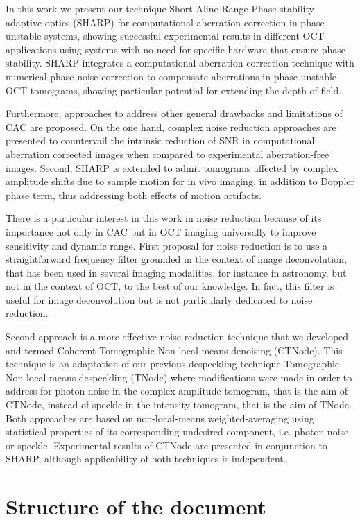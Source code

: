 In this work we present our technique Short Aline-Range Phase-stability adaptive-optics (SHARP) for computational aberration correction in phase unstable systems, showing successful experimental results in different OCT applications using systems with no need for specific hardware that ensure phase stability. SHARP integrates a computational aberration correction technique with numerical phase noise correction to compensate aberrations in phase unstable OCT tomograms, showing particular potential for extending the depth-of-field.

Furthermore, approaches to address other general drawbacks and limitations of CAC are proposed. On the one hand, complex noise reduction approaches are presented to countervail the intrinsic reduction of SNR in computational aberration corrected images when compared to experimental aberration-free images. Second, SHARP is extended to admit tomograms affected by complex amplitude shifts due to sample motion for in vivo imaging, in addition to Doppler phase term, thus addressing both effects of motion artifacts.

There is a particular interest in this work in noise reduction because of its importance not only in CAC but in OCT imaging universally to improve sensitivity and dynamic range. First proposal for noise reduction is to use a straightforward frequency filter grounded in the context of image deconvolution, that has been used in several imaging modalities, for instance in astronomy, but not in the context of OCT, to the best of our knowledge. In fact, this filter is useful for image deconvolution but is not particularly dedicated to noise reduction.

Second approach is a more effective noise reduction technique that we developed and termed Coherent Tomographic Non-local-means denoising (CTNode). This technique is an adaptation of our previous despeckling technique Tomographic Non-local-means despeckling (TNode) where modifications were made in order to address for photon noise in the complex amplitude tomogram, that is the aim of CTNode, instead of speckle in the intensity tomogram, that is the aim of TNode. Both approaches are based on non-local-means weighted-averaging using statistical properties of its corresponding undesired component, i.e. photon noise or speckle. Experimental results of CTNode are presented in conjunction to SHARP, although applicability of both techniques is independent.

\section{Structure of the document}


